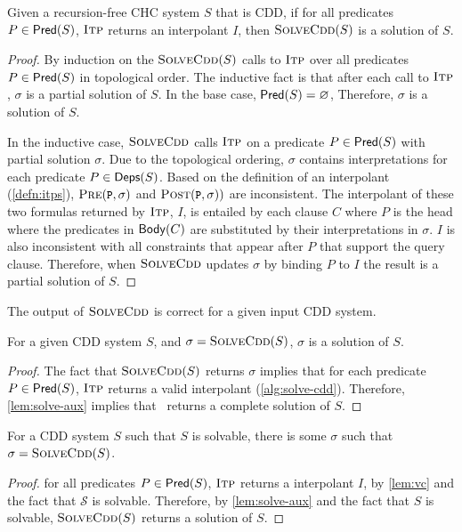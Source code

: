 \begin{lem}
  \label{lem:solve-aux}
  Given a recursion-free CHC system $S$ that is CDD, if for all
  predicates $P \in \mathsf{Pred}( S )$,
  $\textsc{Itp}$ returns
  an interpolant $I$, then $\textsc{SolveCdd}(S)$ is a solution of $S$.
\end{lem}
%
\begin{proof}
  By induction on the $\textsc{SolveCdd}(S)$ calls to $\textsc{Itp}$ over all
  predicates $P \in \mathsf{Pred}( S )$
  in topological order.
  The inductive fact is that after each call to $\textsc{Itp}$, $\sigma$
  is a partial solution of $S$.
  In the base case, $\mathsf{Pred}( S ) = \varnothing$,
  Therefore, $\sigma$ is a solution of $S$.

  In the inductive case, $\textsc{SolveCdd}$ calls $\textsc{Itp}$ on a predicate
  $P \in \mathsf{Pred}( S )$ with partial solution $\sigma$.  Due to the
  topological ordering, $\sigma$ contains interpretations for each
  predicate $P \in \mathsf{Deps}(S)$.
  Based on the definition of an interpolant (\autoref{defn:itps}),
  $\prectr(\cc{P},\sigma)$ and $\postctr(\cc{P},\sigma))$ are
  inconsistent.
  The interpolant of these two formulas returned by $\textsc{Itp}$, $I$,
  is entailed by each clause $C$ where $P$ is the head where the
  predicates in $\mathsf{Body}(C)$ are substituted by their interpretations
  in $\sigma$.
  $I$ is also inconsistent with all constraints that appear after $P$
  that support the query clause.
  Therefore, when $\textsc{SolveCdd}$ updates $\sigma$ by binding $P$ to $I$
  the result is a partial solution of $S$.
\end{proof}

The output of $\textsc{SolveCdd}$ is correct for a given input CDD system.
%
\begin{lem}
  \label{lem:cdd-soln-sound}
  For a given CDD system $S$, and $\sigma = \textsc{SolveCdd}(S)$, %
  $\sigma$ is a solution of $S$.
\end{lem}
%
\begin{proof}
  The fact that $\textsc{SolveCdd}(S)$ returns $\sigma$ implies that for each
  predicate $P \in \mathsf{Pred}( S )$,
  $\textsc{Itp}$ returns
  a valid interpolant (\autoref{alg:solve-cdd}).
  Therefore, \autoref{lem:solve-aux} implies that \solvecdd~returns a
  complete solution of $S$.
\end{proof}

\begin{lem}
  \label{lem:cdd-soln-complete}
  For a CDD system $S$ such that $S$ is
  solvable, %
  there is some $\sigma$ such that %
  $\sigma = \textsc{SolveCdd}(S)$.
\end{lem}
%
\begin{proof}
  for all predicates $P \in \mathsf{Pred}( S )$, $\textsc{Itp}$ returns a
  interpolant $I$, by
  \autoref{lem:vc} and the fact that $\mathcal{S}$ is solvable.
  Therefore, by \autoref{lem:solve-aux} and the fact that
  $S$ is solvable, $\textsc{SolveCdd}(S)$ returns a
  solution of $S$.
\end{proof}

